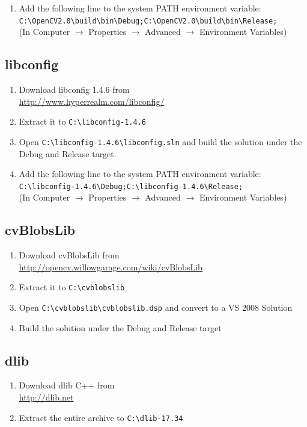 \begin{enumerate}
\item Add the following line to the system PATH environment variable: \\ \texttt{C:\textbackslash OpenCV2.0\textbackslash build\textbackslash bin\textbackslash Debug;C:\textbackslash OpenCV2.0\textbackslash build\textbackslash bin\textbackslash Release;} \\(In Computer $\rightarrow$ Properties $\rightarrow$ Advanced $\rightarrow$ Environment Variables)
\end{enumerate}

\subsection*{libconfig}
\begin{enumerate}
\item Download libconfig 1.4.6 from \\ \url{http://www.hyperrealm.com/libconfig/}
\item Extract it to \texttt{C:\textbackslash libconfig-1.4.6}
\item Open \texttt{C:\textbackslash libconfig-1.4.6\textbackslash libconfig.sln} and build the solution under the Debug and Release target.
\item Add the following line to the system PATH environment variable: \\ \texttt{C:\textbackslash libconfig-1.4.6\textbackslash Debug;C:\textbackslash libconfig-1.4.6\textbackslash Release;} \\(In Computer $\rightarrow$ Properties $\rightarrow$ Advanced $\rightarrow$ Environment Variables) 
\end{enumerate}
\subsection*{cvBlobsLib}
\begin{enumerate}
\item Download cvBlobsLib from \\ \url{http://opencv.willowgarage.com/wiki/cvBlobsLib}
\item Extract it to \texttt{C:\textbackslash cvblobslib}
\item Open \texttt{C:\textbackslash cvblobslib\textbackslash cvblobslib.dsp} and convert to a VS 2008 Solution
\item Build the solution under the Debug and Release target
\end{enumerate}
\subsection*{dlib}
\begin{enumerate}
\item Download dlib C++ from \\ \url{http://dlib.net}
\item Extract the entire archive to \texttt{C:\textbackslash dlib-17.34}
\end{enumerate}
